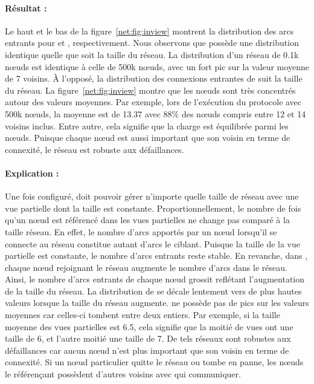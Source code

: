 \paragraph{Résultat :} Le haut et le bas de la figure~\ref{net:fig:inview}
montrent la distribution des arcs entrants pour \CYCLON et \SPRAY,
respectivement. Nous observons que \CYCLON possède une distribution identique
quelle que soit la taille du réseau. La distribution d'un réseau de 0.1k nœuds
est identique à celle de 500k nœuds, avec un fort pic sur la valeur moyenne de 7
voisins. À l'opposé, la distribution des connexions entrantes de \SPRAY suit la
taille du réseau. La figure~\ref{net:fig:inview} montre que les nœuds sont très
concentrés autour des valeurs moyennes. Par exemple, lors de l'exécution du
protocole \SPRAY avec 500k nœuds, la moyenne est de 13.37 avec 88\% des nœuds
compris entre 12 et 14 voisins inclus. Entre autre, cela signifie que la charge
est équilibrée parmi les nœuds. Puisque chaque nœud est aussi important que son
voisin en terme de connexité, le réseau est robuste aux défaillances.

\paragraph{Explication :} Une fois configuré, \CYCLON doit pouvoir gérer
n'importe quelle taille de réseau avec une vue partielle dont la taille est
constante. Proportionnellement, le nombre de fois qu'un nœud est référencé dans
les vues partielles ne change pas comparé à la taille réseau. En effet, le
nombre d'arcs apportés par un nœud lorsqu'il se connecte au réseau constitue
autant d'arcs le ciblant. Puisque la taille de la vue partielle est constante,
le nombre d'arcs entrants reste stable. En revanche, dans \SPRAY, chaque nœud
rejoignant le réseau augmente le nombre d'arcs dans le réseau. Ainsi, le nombre
d'arcs entrants de chaque nœud grossit reflétant l'augmentation de la taille du
réseau. La distribution de \SPRAY se décale lentement vers de plus hautes
valeurs lorsque la taille du réseau augmente. \SPRAY ne possède pas de pics sur
les valeurs moyennes car celles-ci tombent entre deux entiers. Par exemple, si
la taille moyenne des vues partielles est 6.5, cela signifie que la moitié de
vues ont une taille de 6, et l'autre moitié une taille de 7. De tels réseaux
sont robustes aux défaillances car aucun nœud n'est plus important que son
voisin en terme de connexité. Si un nœud particulier quitte le réseau ou tombe
en panne, les nœuds le référençant possèdent d'autres voisins avec qui
communiquer.


